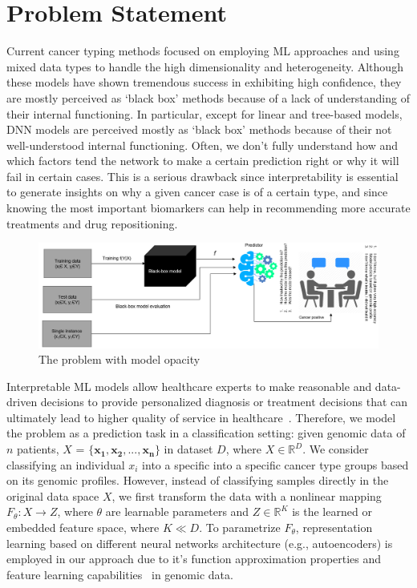 \section{Problem Statement} \label{problem_challenges}
Current cancer typing methods focused on employing ML approaches and using mixed data types to handle the high dimensionality and heterogeneity. Although these models have shown tremendous success in exhibiting high confidence, they are mostly perceived as `black box' methods because of a lack of understanding of their internal functioning. In particular, except for linear and tree-based models, DNN models are perceived mostly as `black box' methods because of their not well-understood internal functioning. Often, we don't fully understand how and which factors tend the network to make a certain prediction right or why it will fail in certain cases. This is a serious drawback since interpretability is essential to generate insights on why a given cancer case is of a certain type, and since knowing the most important biomarkers can help in recommending more accurate treatments and drug repositioning. 

\begin{figure}
	\centering
	\includegraphics[width=0.9\linewidth]{images/bbm.png}
	\caption{The problem with model opacity}
    \label{fig:model_bbm}
    \vspace{-2mm}
\end{figure}

\hspace*{3.5mm} Interpretable ML models allow healthcare experts to make reasonable and data-driven decisions to provide personalized diagnosis or treatment decisions that can ultimately lead to higher quality of service in healthcare~\cite{stiglic2020interpretability}. Therefore, we model the problem as a prediction task in a classification setting: given genomic data of $n$ patients, $X$ = ${\mathbf{\{x_1,x_2,..., x_n}}\}$ in dataset $D$, where $X \in \mathbb{R}^{D}$. We consider classifying an individual $x_i$ into a specific into a specific cancer type groups based on its genomic profiles. However, instead of classifying samples directly in the original data space $X$, we first transform the data with a nonlinear mapping $F_{\theta}: X \rightarrow Z$, where $\theta$ are learnable parameters and $Z \in \mathbb{R}^{K}$ is the learned or embedded feature space, where $K \ll D$. To parametrize $F_{\theta}$, representation learning based on different neural networks architecture (e.g., autoencoders) is employed in our approach due to it's function approximation properties and feature learning capabilities~\cite{xie2016unsupervised} in genomic data.  


